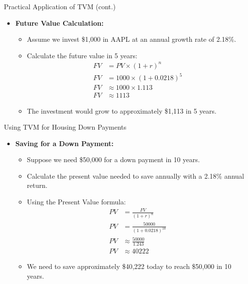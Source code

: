 \documentclass{beamer}
\begin{document}
\begin{frame}{Practical Application of TVM (cont.)}
    \begin{itemize}
        \item \textbf{Future Value Calculation:}
        \begin{itemize}
            \item Assume we invest \$1,000 in AAPL at an annual growth rate of 2.18\%.
            \item Calculate the future value in 5 years:
            \begin{align*}
                FV &= PV \times (1 + r)^n \\
                FV &= 1000 \times (1 + 0.0218)^5 \\
                FV &\approx 1000 \times 1.113 \\
                FV &\approx 1113
            \end{align*}
            \item The investment would grow to approximately \$1,113 in 5 years.
        \end{itemize}
    \end{itemize}
\end{frame}

\begin{frame}{Using TVM for Housing Down Payments}
    \begin{itemize}
        \item \textbf{Saving for a Down Payment:}
        \begin{itemize}
            \item Suppose we need \$50,000 for a down payment in 10 years.
            \item Calculate the present value needed to save annually with a 2.18\% annual return.
            \item Using the Present Value formula:
            \begin{align*}
                PV &= \frac{FV}{(1 + r)^n} \\
                PV &= \frac{50000}{(1 + 0.0218)^{10}} \\
                PV &\approx \frac{50000}{1.243} \\
                PV &\approx 40222
            \end{align*}
            \item We need to save approximately \$40,222 today to reach \$50,000 in 10 years.
        \end{itemize}
    \end{itemize}
\end{frame}
\end{document}
